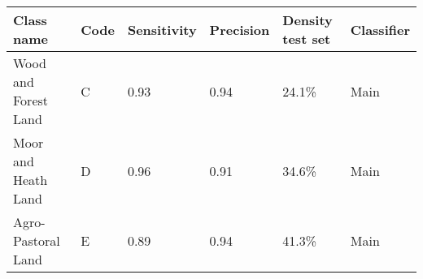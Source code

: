 \begin{tabular}{llllll}
\toprule
 \textbf{Class name} & \textbf{Code} & \textbf{Sensitivity} & \textbf{Precision} & \textbf{Density test set} & \textbf{Classifier} \\
\midrule
Wood and Forest Land &             C &                 0.93 &               0.94 &                    24.1\% &                Main \\
 Moor and Heath Land &             D &                 0.96 &               0.91 &                    34.6\% &                Main \\
  Agro-Pastoral Land &             E &                 0.89 &               0.94 &                    41.3\% &                Main \\
\bottomrule
\end{tabular}
